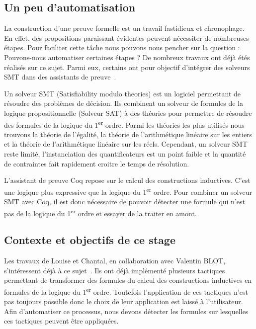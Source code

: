 \documentclass[titlepage,draft]{article}
\begin{document}
\subsection{Un peu d'automatisation}
La construction d'une preuve formelle est un travail fastidieux et chronophage. En effet, des propositions paraissant évidentes peuvent nécessiter de nombreuses étapes.
Pour faciliter cette tâche nous pouvons nous pencher sur la question : Pouvons-nous automatiser certaines étapes ? De nombreux travaux ont déjà étés réalisés sur ce sujet. Parmi eux, certains ont pour objectif d'intégrer des solveurs SMT dans des assistants de preuve~\cite{DBLP:conf/cpp/ArmandFGKTW11}.

Un solveur SMT (Satisfiability modulo theories) est un logiciel permettant de résoudre des problèmes de décision. Ils combinent un solveur de formules de la logique propositionnelle (Solveur SAT) à des théories pour permettre de résoudre des formules de la logique du 1\textsuperscript{er} ordre. Parmi les théories les plus utilisés nous trouvons la théorie de l'égalité, la théorie de l'arithmétique linéaire sur les entiers et la théorie de l'arithmétique linéaire sur les réels. Cependant, un solveur SMT reste limité, l'instanciation des quantificateurs est un point faible et la quantité de contraintes fait rapidement croitre le temps de résolution.

L'assistant de preuve Coq repose sur le calcul des constructions inductives. C'est une logique plus expressive que la logique du 1\textsuperscript{er} ordre. Pour combiner un solveur SMT avec Coq, il est donc nécessaire de pouvoir détecter une formule qui n'est pas de la logique du 1\textsuperscript{er} ordre et essayer de la traiter en amont.

\subsection{Contexte et objectifs de ce stage}
Les travaux de Louise et Chantal, en collaboration avec Valentin BLOT, s'intéressent déjà à ce sujet~\cite{DBLP:journals/corr/abs-2107-02353,DBLP:journals/corr/abs-2204-02643,DBLP:conf/cpp/Blot0CPKMV23}. Ils ont déjà implémenté plusieurs tactiques permettant de transformer des formules du calcul des constructions inductives en formules de la logique du 1\textsuperscript{er} ordre. Toutefois l'application de ces tactiques n'est pas toujours possible donc le choix de leur application est laissé à l'utilisateur. Afin d'automatiser ce processus, nous devons détecter les formules sur lesquelles ces tactiques peuvent être appliquées.
\end{document}
